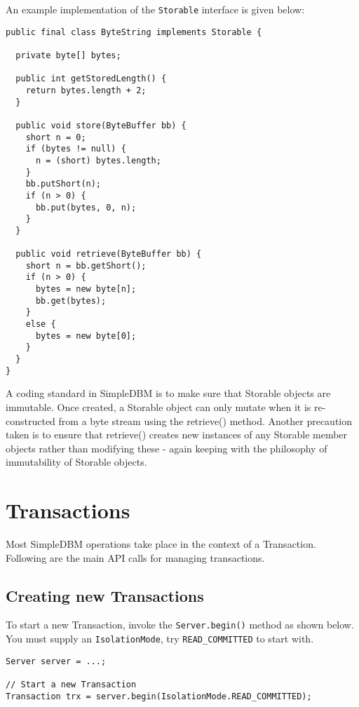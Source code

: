 \documentclass[a4paper,draft,oneside]{book}
\begin{document}
An example implementation of the \verb|Storable| interface is 
given below:

\begin{verbatim}
public final class ByteString implements Storable {
    
  private byte[] bytes;
    
  public int getStoredLength() {
    return bytes.length + 2;
  }
    
  public void store(ByteBuffer bb) {
    short n = 0;
    if (bytes != null) {
      n = (short) bytes.length;
    }
    bb.putShort(n);
    if (n > 0) {
      bb.put(bytes, 0, n);
    }
  }
    
  public void retrieve(ByteBuffer bb) {
    short n = bb.getShort();
    if (n > 0) {
      bytes = new byte[n];
      bb.get(bytes);
    }
    else {
      bytes = new byte[0];
    }
  }
}
\end{verbatim}

A coding standard in SimpleDBM is to make sure that Storable
objects are immutable. Once created, a Storable object can 
only mutate when it is re-constructed from a byte stream using the
retrieve() method. Another precaution taken is to ensure that
retrieve() creates new instances of any Storable member objects rather
than modifying these - again keeping with the philosophy of immutability
of Storable objects. 

\chapter{Transactions}

Most SimpleDBM operations take place in the context of a Transaction.
Following are the main API calls for managing transactions.

\section{Creating new Transactions}

To start a new Transaction, invoke the \verb|Server.begin()| method as
shown below. You must supply an \verb|IsolationMode|, try
\verb|READ_COMMITTED| to start with.

\begin{verbatim}
Server server = ...;

// Start a new Transaction
Transaction trx = server.begin(IsolationMode.READ_COMMITTED);

\end{verbatim}
\end{document}
